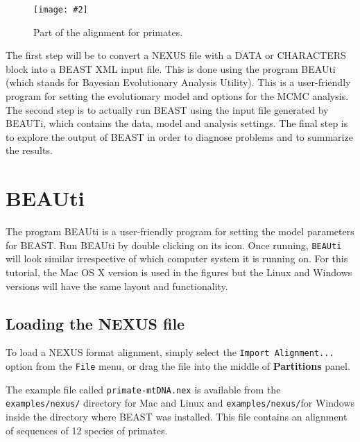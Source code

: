 \documentclass[12pt]{article}
\newcommand{\includeimage}[2][]{%
\texttt{[image: \#2]}
}
\begin{document}
\begin{figure}	
\centering
\includeimage[width=\textwidth]{figures/AlignmentViewer}
\caption{Part of the alignment for primates.}
\label{fig:primateAlignment}
\end{figure}

The first step will be to convert a NEXUS file with a DATA or CHARACTERS block into a BEAST XML input file. This is done using the program BEAUti (which stands for Bayesian Evolutionary Analysis Utility). 
This is a user-friendly program for setting the evolutionary model and options for the MCMC analysis. 
The second step is to actually run BEAST using the input file generated by BEAUTi,  which
contains the data, model and analysis settings. 
The final step is to explore the output of BEAST in order to diagnose problems and to summarize the results.

\section{BEAUti}

The program BEAUti is a user-friendly program for setting the
model parameters for BEAST. Run BEAUti by double clicking on its icon. Once running, \texttt{BEAUti} will look similar irrespective
of which computer system it is running on. For this tutorial, the Mac OS X version is used in the figures but
the Linux and Windows versions will have the same layout and functionality.


\subsection{Loading the NEXUS file }

To load a NEXUS format alignment, simply select the \texttt{Import Alignment...} option from the \texttt{File} menu, or drag the file into the middle of {\bf Partitions} panel. 

The example file called \texttt{primate-mtDNA.nex} is available from the {\tt examples/nexus/} directory for Mac and Linux and  {\tt examples/nexus/}for Windows inside the directory where BEAST was installed.
This file contains an alignment of sequences of 12 species of primates. 
\end{document}
